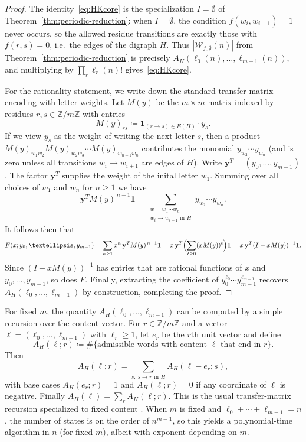 \documentclass[12pt]{amsart}
\theoremstyle{definition}
\theoremstyle{remark}
\newcommand{\Z}{\mathbb{Z}}
\newcommand{\abs}[1]{\left|#1\right|}
\begin{document}
\begin{proof}
The identity~\eqref{eq:HKcore} is the specialization \(I=\emptyset\) of Theorem~\ref{thm:periodic-reduction}: when \(I=\emptyset\), the condition \(f(w_i,w_{i+1})=1\) never occurs, so the
allowed residue transitions are exactly those with \(f(r,s)=0\), i.e.\ the edges of the digraph \(H\).
Thus \(\abs{\mathcal{W}_{f,\emptyset}(n)}\) from Theorem~\ref{thm:periodic-reduction} is precisely
\(A_H(\ell_0(n),\dots,\ell_{m-1}(n))\), and multiplying by \(\prod_r \ell_r(n)!\) gives~\eqref{eq:HKcore}.

For the rationality statement, we write down the standard transfer-matrix encoding with letter-weights. Let \(M(y)\) be the \(m\times m\) matrix indexed by residues \(r,s\in\Z/m\Z\) with entries
\[
 M(y)_{rs}\coloneqq \mathbf{1}_{(r\to s)\in E(H)}\cdot y_s.
\]
If we view \(y_s\) as the weight of writing the next letter \(s\), then a product
\(M(y)_{w_1w_2}M(y)_{w_2w_3}\cdots M(y)_{w_{n-1}w_n}\) contributes the monomial \(y_{w_2}\cdots y_{w_n}\) (and is zero
unless all transitions \(w_i\to w_{i+1}\) are edges of \(H\)). Write $\mathbf{y}^T=(y_0,\ldots,y_{m-1})$. The factor $\mathbf{y}^T$ supplies the weight of the inital letter $w_1$. Summing over all choices of \(w_1\) and \(w_n\) for \(n\ge 1\) we have
\[
 \mathbf{y}^T M(y)^{\,n-1}\mathbf{1}
 =
 \sum_{\substack{w=w_1\cdots w_n\\ w_i\to w_{i+1}\text{ in }H}}
 y_{w_2}\cdots y_{w_n}.
\]
It follows then that
\[
 F(x;y_0,\ldots,y_{m-1})=\sum_{n\ge 1} x^n\,\mathbf{y}^T M(y)^{\,n-1}\mathbf{1}
 =
 x\,\mathbf{y}^T\Bigl(\sum_{t\ge 0} (xM(y))^{t}\Bigr)\mathbf{1}
 =
 x\,\mathbf{y}^T(I-xM(y))^{-1}\mathbf{1}.
\]
Since \((I-xM(y))^{-1}\) has entries that are rational functions of \(x\) and \(y_0,\dots,y_{m-1}\), so does \(F\).
Finally, extracting the coefficient of \(y_0^{\ell_0}\cdots y_{m-1}^{\ell_{m-1}}\) recovers
\(A_H(\ell_0,\dots,\ell_{m-1})\) by construction, completing the proof.
\end{proof}


For fixed $m$, the quantity $A_H(\ell_0,\dots,\ell_{m-1})$ can be computed by a simple recursion over the content
vector.  For $r\in\Z/m\Z$ and a vector $\ell=(\ell_0,\dots,\ell_{m-1})$ with $\ell_r\ge 1$, let $e_r$ be the $r$th unit
vector and define
\[
A_H(\ell;r)\coloneqq \#\{\text{admissible words with content }\ell\text{ that end in }r\}.
\]
Then
\[
A_H(\ell;r)=\sum_{s:\,s\to r\text{ in }H} A_H(\ell-e_r;s),
\]
with base cases $A_H(e_r;r)=1$ and $A_H(\ell;r)=0$ if any coordinate of $\ell$ is negative.
Finally $A_H(\ell)=\sum_r A_H(\ell;r)$.  This is the usual transfer-matrix recursion specialized to fixed content
\cite{flajolet-sedgewick,stanley-ec1}.  When $m$ is fixed and $\ell_0+\cdots+\ell_{m-1}=n$, the number of states is on
the order of $n^{m-1}$, so this yields a polynomial-time algorithm in $n$ (for fixed $m$), albeit with exponent
depending on $m$.
\end{document}

